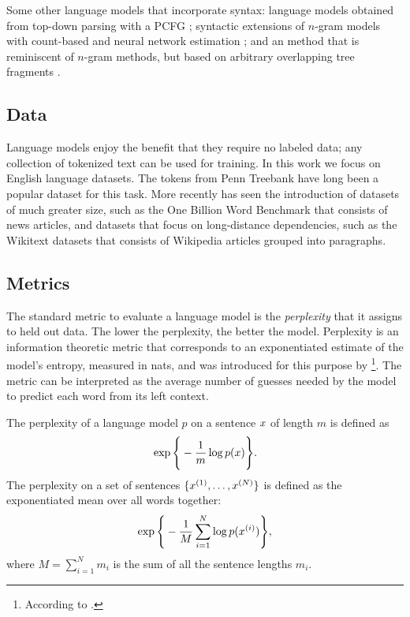     Some other language models that incorporate syntax: language models obtained from top-down parsing with a PCFG \citep{roark2001probabilistic}; syntactic extensions of $n$-gram models with count-based and neural network estimation \citep{chelba2000structured,emami2005neural}; and an method that is reminiscent of $n$-gram methods, but based on arbitrary overlapping tree fragments \citep{pauls2012treelets}.

  \subsection{Data}
    Language models enjoy the benefit that they require no labeled data; any collection of tokenized text can be used for training. In this work we focus on English language datasets. The tokens from Penn Treebank have long been a popular dataset for this task. More recently has seen the introduction of datasets of much greater size, such as the One Billion Word Benchmark \citep{chelba2013one} that consists of news articles, and datasets that focus on long-distance dependencies, such as the Wikitext datasets \citep{merity2016pointer} that consists of Wikipedia articles grouped into paragraphs.

  \subsection{Metrics}
    The standard metric to evaluate a language model is the \textit{perplexity} that it assigns to held out data. The lower the perplexity, the better the model. Perplexity is an information theoretic metric that corresponds to an exponentiated estimate of the model's entropy, measured in nats, and was introduced for this purpose by \citet{jelinek1997information}\footnote{According to \citep{chelba2017n}.}. The metric can be interpreted as the average number of guesses needed by the model to predict each word from its left context.

    \begin{definition}{} The perplexity of a language model $p$ on a sentence $x$ of length $m$ is defined as
    \begin{align*}
      \exp \Bigg\{ - \frac{1}{m} \log p( x ) \Bigg\}.
    \end{align*}
    The perplexity on a set of sentences $\{ x^{(1)}, \dots, x^{(N)} \}$ is defined as the exponentiated mean over all words together:
    \begin{align*}
      \exp \Bigg\{ - \frac{1}{M} \sum_{i=1}^N \log p( x^{(i)} ) \Bigg\},
    \end{align*}
    where $M = \sum_{i=1}^N m_i$ is the sum of all the sentence lengths $m_i$.
    \end{definition}

